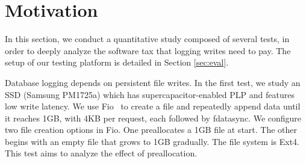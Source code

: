 
\section{Motivation}\label{sec:motivation}


In this section, we conduct a quantitative study  composed of several tests, in order
to deeply analyze the software tax that logging writes need to pay.
The setup of our testing platform is detailed in Section \ref{sec:eval}.


\iftrue
\vspace{1ex}
\noindent{}
\vspace{0.5ex}
\else
\ul{$\vmathbb{O1}$. \em
	The  preallocation  strategy significantly
	boosts the performance of database logging writes. %
}
\fi

Database logging depends on   persistent file writes.
In the first test, we study an SSD (Samsung PM1725a)  which has supercapacitor-enabled PLP   and features low write latency. 
We use Fio~\cite{1fioFlex42:online} to create a file and repeatedly append data until it reaches 1GB, 
with 4KB per   request, each followed by   {fdatasync}. 
We configure two file creation options in Fio.
One preallocates a 1GB file at   start.
The other begins with an empty file that  grows to 1GB gradually. 
The file system is Ext4.
This test aims to analyze the effect of  preallocation. 


